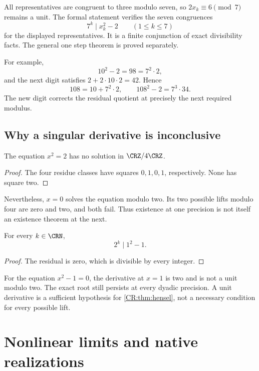 All representatives are congruent to three modulo seven, so $2x_k\equiv6\pmod7$ remains a unit. The formal statement  verifies the seven congruences
\[
7^k\mid x_k^2-2\qquad (1\leq k\leq7)
\]
for the displayed representatives. It is a finite conjunction of exact divisibility facts. The general one step theorem is proved separately.

For example,
\[
10^2-2=98=7^2\cdot2,
\]
and the next digit satisfies $2+2\cdot10\cdot2=42$. Hence
\[
108=10+7^2\cdot2,
\qquad 108^2-2=7^3\cdot34.
\]
The new digit corrects the residual quotient at precisely the next required modulus.

\subsection{Why a singular derivative is inconclusive}
\begin{CRproposition}\label{CR:prop:mod4}
The equation $x^2=2$ has no solution in $\CRZ/4\CRZ$.
\end{CRproposition}
\begin{proof}
The four residue classes have squares $0,1,0,1$, respectively. None has square two.
\end{proof}

Nevertheless, $x=0$ solves the equation modulo two. Its two possible lifts modulo four are zero and two, and both fail. Thus existence at one precision is not itself an existence theorem at the next.

\begin{CRproposition}\label{CR:prop:singular-success}
For every $k\in\CRN$,
\[
2^k\mid 1^2-1.
\]
\end{CRproposition}
\begin{proof}
The residual is zero, which is divisible by every integer.
\end{proof}

For the equation $x^2-1=0$, the derivative at $x=1$ is two and is not a unit modulo two. The exact root still persists at every dyadic precision. A unit derivative is a sufficient hypothesis for \cref{CR:thm:hensel}, not a necessary condition for every possible lift.

\section{Nonlinear limits and native realizations}\label{CR:cr-source-section-7}\label{CR:ch:limits}
